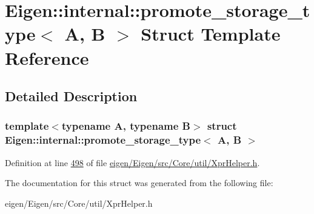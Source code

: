 \hypertarget{struct_eigen_1_1internal_1_1promote__storage__type}{}\section{Eigen\+:\+:internal\+:\+:promote\+\_\+storage\+\_\+type$<$ A, B $>$ Struct Template Reference}
\label{struct_eigen_1_1internal_1_1promote__storage__type}


\subsection{Detailed Description}
\subsubsection*{template$<$typename A, typename B$>$\newline
struct Eigen\+::internal\+::promote\+\_\+storage\+\_\+type$<$ A, B $>$}



Definition at line \hyperlink{eigen_2_eigen_2src_2_core_2util_2_xpr_helper_8h_source_l00498}{498} of file \hyperlink{eigen_2_eigen_2src_2_core_2util_2_xpr_helper_8h_source}{eigen/\+Eigen/src/\+Core/util/\+Xpr\+Helper.\+h}.



The documentation for this struct was generated from the following file\+:\begin{DoxyCompactItemize}
\item 
eigen/\+Eigen/src/\+Core/util/\+Xpr\+Helper.\+h\end{DoxyCompactItemize}
